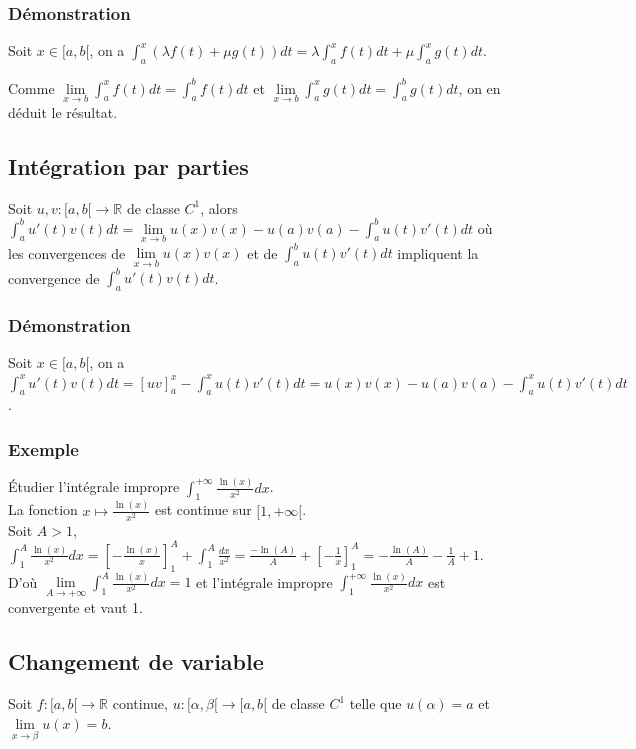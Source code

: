 \documentclass[a4paper,10pt]{book} %
\newcommand{\R}{\mathbb{R}}
\newcommand{\displayAmath}{\displaystyle}
\begin{document}
\subsubsection{Démonstration}
Soit $x\in [a,b[$, on a
$\displayAmath\int_{a}^{x}(\lambda f(t)+\mu g(t))dt=\lambda \int_{a}^{x}f(t)dt+\mu \int_{a}^{x}g(t)dt$.

Comme
$\displayAmath\lim\limits_{x\rightarrow b}\int_{a}^{x}f(t)dt=\int_{a}^{b}f(t)dt$ et
$\displayAmath\lim\limits_{x\rightarrow b}\int_{a}^{x}g(t)dt=\int_{a}^{b}g(t)dt$, on en déduit le résultat.

\subsection{Intégration par parties}
Soit $u,v : [a,b[\rightarrow\R$ de classe $C^1$, alors $\displayAmath\int_a^bu'(t)v(t)dt=\lim\limits_{x\rightarrow b}u(x)v(x)-u(a)v(a)-\int_a^bu(t)v'(t)dt$
où les convergences de $\displayAmath\lim\limits_{x\rightarrow b}u(x)v(x)$ et de $\displayAmath\int_a^bu(t)v'(t)dt$ impliquent la convergence de $\displayAmath\int_a^bu'(t)v(t)dt$.

\subsubsection{Démonstration}
Soit $x\in [a,b[$, on a $\displayAmath\int_a^xu'(t)v(t)dt=[uv]_a^x-\int_{a}^{x}u(t)v'(t)dt= u(x)v(x)-u(a)v(a)-\int_a^xu(t)v'(t)dt$.

\subsubsection{Exemple}
Étudier l'intégrale impropre $\displayAmath\int_1^{+\infty} \frac{\ln(x)}{x^2}dx$.\\
La fonction $x\mapsto \frac{\ln(x)}{x^2}$ est continue sur $[1,+\infty[$.\\

Soit $A>1$, $\displayAmath\int_1^A\frac{\ln(x)}{x^2}dx=[-\frac{\ln(x)}{x}]_1^A+\int_1^A\frac{dx}{x^2}= \frac{-\ln(A)}{A}+[-\frac{1}{x}]_1^A=-\frac{\ln(A)}{A}-\frac{1}{A}+1$.\\
D'où $\displayAmath\lim\limits_{A\rightarrow +\infty}\int_1^A\frac{\ln(x)}{x^2}dx=1$ et l'intégrale impropre $\displayAmath\int_{1}^{+\infty}\frac{\ln(x)}{x^2}dx$ est convergente et vaut 1.

\subsection{Changement de variable}
Soit $f:[a,b[\rightarrow \R$ continue, $u:[\alpha,\beta[\rightarrow [a,b[$ de classe $C^1$ telle que $u(\alpha)=a$ et $\lim\limits_{x\rightarrow \beta}u(x)=b$.\\
\end{document}
